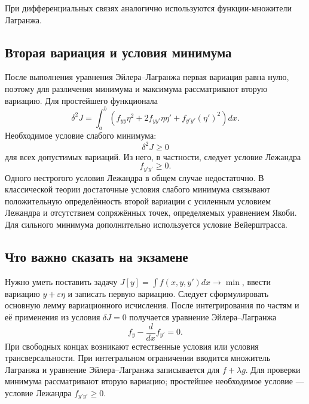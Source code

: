 При дифференциальных связях аналогично используются функции-множители
Лагранжа.

\subsection{Вторая вариация и условия минимума}

После выполнения уравнения Эйлера--Лагранжа первая вариация равна нулю, поэтому
для различения минимума и максимума рассматривают вторую вариацию. Для
простейшего функционала
\[
    \delta^2J=\int_a^b
    \left(
        f_{yy}\eta^2
        +2f_{yy'}\eta\eta'
        +f_{y'y'}(\eta')^2
    \right)dx.
\]
Необходимое условие слабого минимума:
\[
    \delta^2J\geq0
\]
для всех допустимых вариаций. Из него, в частности, следует условие Лежандра
\[
    f_{y'y'}\geq0.
\]
Одного нестрогого условия Лежандра в общем случае недостаточно. В классической
теории достаточные условия слабого минимума связывают положительную
определённость второй вариации с усиленным условием Лежандра и отсутствием
сопряжённых точек, определяемых уравнением Якоби. Для сильного минимума
дополнительно используется условие Вейерштрасса.

\subsection{Что важно сказать на экзамене}

Нужно уметь поставить задачу
$J[y]=\int f(x,y,y')dx\to\min$, ввести вариацию
$y+\varepsilon\eta$ и записать первую вариацию. Следует сформулировать
основную лемму вариационного исчисления. После интегрирования по частям и её
применения из условия $\delta J=0$ получается уравнение Эйлера--Лагранжа
\[
    f_y-\frac{d}{dx}f_{y'}=0.
\]
При свободных концах возникают естественные условия или условия
трансверсальности. При интегральном ограничении вводится множитель Лагранжа и
уравнение Эйлера--Лагранжа записывается для $f+\lambda g$. Для проверки
минимума рассматривают вторую вариацию; простейшее необходимое условие ---
условие Лежандра $f_{y'y'}\geq0$.

\newpage
